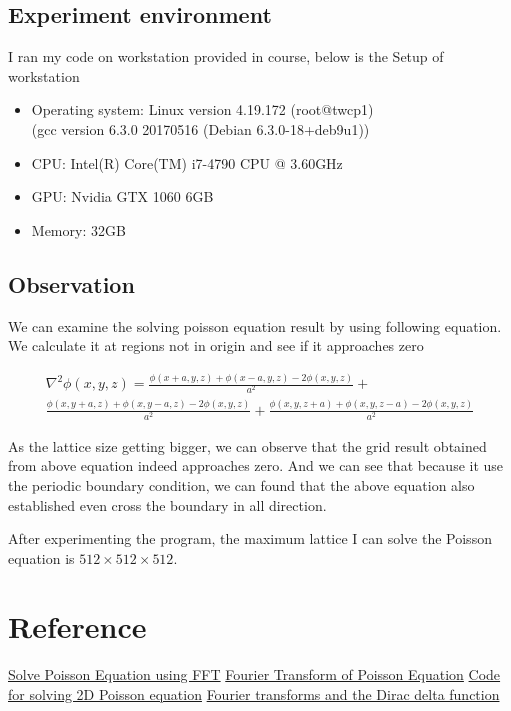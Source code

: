\documentclass{article}
\begin{document}
	\subsection{Experiment environment}
	I ran my code on workstation provided in course, below is the Setup of workstation
	\begin{itemize}
		\item Operating system: Linux version 4.19.172 (root@twcp1)\\(gcc version 6.3.0 20170516 (Debian 6.3.0-18+deb9u1))
		\item CPU: Intel(R) Core(TM) i7-4790 CPU @ 3.60GHz
		\item GPU: Nvidia GTX 1060 6GB
		\item Memory: 32GB 
	\end{itemize}	
	
	
	\subsection{Observation}
	We can examine the solving poisson equation result by using following equation. We calculate it at regions not in origin and see if it approaches zero
	
	\begin{equation}
		\begin{aligned}
		\nabla^2\phi(x, y, z)=\frac{\phi(x+a, y, z)+\phi(x-a, y, z)-2\phi(x, y, z)}{a^2}+\\\frac{\phi(x, y+a, z)+\phi(x, y-a, z)-2\phi(x, y, z)}{a^2}+\frac{\phi(x, y, z+a)+\phi(x, y, z-a)-2\phi(x, y, z)}{a^2}
		\end{aligned}
	\end{equation}
	
	As the lattice size getting bigger, we can observe that the grid result obtained from above equation indeed approaches zero. And we can see that because it use the periodic boundary condition, we can found that the above equation also established even cross the boundary in all direction.
	
	
	After experimenting the program, the maximum lattice I can solve the Poisson equation is $512\times 512\times 512$.
	
	\section{Reference}
\href{https://math.stackexchange.com/questions/1809871/solve-poisson-equation-using-fft}{Solve Poisson Equation using FFT}
\href{https://math.stackexchange.com/questions/877966/fourier-transform-of-poisson-equation/877967}{Fourier Transform of Poisson Equation}
\href{https://github.com/phrb/intro-cuda/blob/master/src/cuda-samples/7_CUDALibraries/simpleCUFFT_2d_MGPU/simpleCUFFT_2d_MGPU.cu}{Code for solving 2D Poisson equation}
\href{http://links.uwaterloo.ca/amath353docs/set11.pdf}{Fourier transforms and the Dirac delta function}
	
\end{document}
